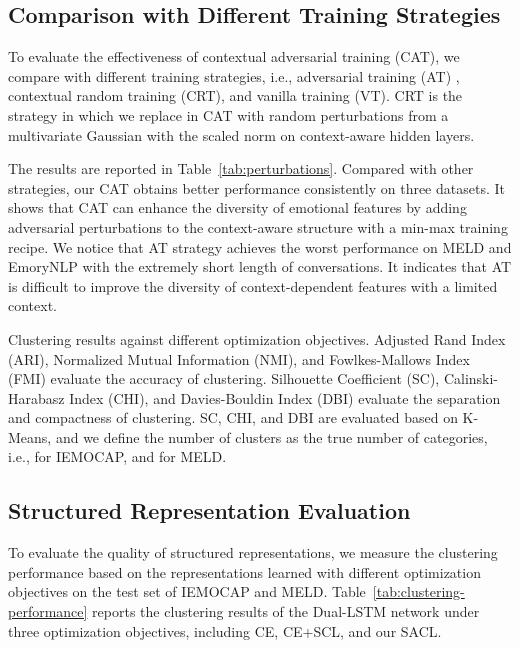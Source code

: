\documentclass[11pt]{article}
\begin{document}
\subsection{Comparison with Different Training Strategies} 
To evaluate the effectiveness of contextual adversarial training (CAT), 
we compare with different training strategies, i.e., adversarial training (AT) \cite{DBLP:conf/iclr/MiyatoDG17}, contextual random training (CRT), and vanilla training (VT). CRT is the strategy in which we replace  in CAT with random perturbations from a multivariate Gaussian with the scaled norm on context-aware hidden layers.

The results are reported in Table~\ref{tab:perturbations}. 
Compared with other strategies, our CAT obtains better performance consistently on three datasets.
It shows that CAT can enhance the diversity of emotional features by adding adversarial perturbations to the context-aware structure with a min-max training recipe.
We notice that AT strategy achieves the worst performance on MELD and EmoryNLP with the extremely short length of conversations. It indicates that AT is difficult to improve the diversity of context-dependent features with a limited context.

\begin{table}[t]
\centering
\resizebox{1\linewidth}{!}{\uparrow\uparrow\uparrow\uparrow\uparrow\downarrow}
\caption{Clustering results against different optimization objectives. 
Adjusted Rand Index (ARI), Normalized Mutual Information (NMI),  and Fowlkes-Mallows Index (FMI) evaluate the accuracy of clustering. Silhouette Coefficient (SC), Calinski-Harabasz Index (CHI), and Davies-Bouldin Index (DBI) evaluate the separation and compactness of clustering.
SC, CHI, and DBI are evaluated based on K-Means, and we define the number of clusters  as the true number of categories, i.e.,  for IEMOCAP, and  for MELD.}
\label{tab:clustering-performance}
\end{table}

\subsection{Structured Representation Evaluation}
To evaluate the quality of structured representations, we measure the clustering performance based on the representations learned with different optimization objectives on the test set of IEMOCAP and MELD.
Table~\ref{tab:clustering-performance} reports the clustering results of the Dual-LSTM network under three optimization objectives, including CE,  CE+SCL, and our SACL.
\end{document}
